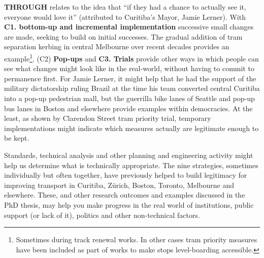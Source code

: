 \documentclass{tufte-handout}
\begin{document}
 \textbf{THROUGH}  relates to the idea that “if they had a chance to actually see it, everyone would love it” (attributed to Curitiba's Mayor, Jamie Lerner\cite{McKibben:2007aa}). With \textbf{C1. bottom-up and incremental implementation} successive small changes are made, seeking to build on initial successes. The gradual addition of tram separation kerbing in central Melbourne over recent decades provides an example\footnote{Sometimes during track renewal works.   In other cases tram priority measures have been included as part of works to make stops level-boarding accessible.}. (C2) \textbf{Pop-ups} and \textbf{C3. Trials} provide other ways in which people can see what changes might look like in the real-world, without having to commit to permanence first.  For Jamie Lerner, it might help that he had the support of the military dictatorship ruling Brazil at the time his team converted central Curitiba into a pop-up pedestrian mall, but the guerrilla bike lanes of Seattle\cite{Fucoloro:2013aa} and pop-up bus lanes in Boston and elsewhere\cite{Transportation-Studies:2019aa} provide examples within democracies. At the least, as shown by Clarendon Street tram priority trial\cite{Silkstone:2005aa}, temporary implementations might indicate which measures actually are legitimate enough to be kept.

Standards, technical analysis and other planning and engineering activity might help us determine what is technically appropriate. The nine strategies, sometimes individually but often together, have previously helped to build legitimacy for improving transport in Curitiba, Zürich, Boston, Toronto, Melbourne and elsewhere. These, and other research outcomes and examples discussed in the PhD thesis, may help you make progress in the real world of institutions, public support (or lack of it), politics and other non-technical factors. 


\end{document}
